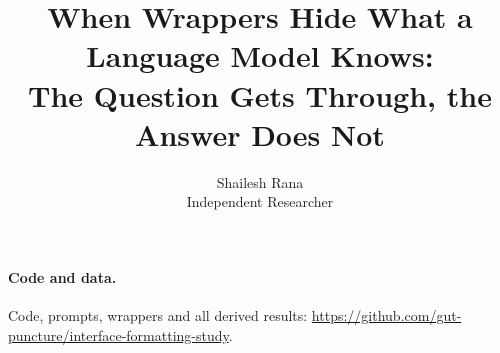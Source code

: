 \documentclass[10pt,twocolumn]{article}
\title{\vspace{-1.0em}\textbf{When Wrappers Hide What a Language Model Knows:\\The Question Gets Through, the Answer Does Not}}
\author{Shailesh Rana\\Independent Researcher}
\date{}
\begin{document}
\twocolumn[
\begin{@twocolumnfalse}
\maketitle
\vspace{-1.4em}
\begin{center}
\begin{minipage}{0.82\textwidth}
\begin{abstract}

\end{abstract}
\end{minipage}
\end{center}
\vspace{0.7em}
\end{@twocolumnfalse}
]








\paragraph{Code and data.} Code, prompts, wrappers and all derived results: \url{https://github.com/gut-puncture/interface-formatting-study}.

\small



\small
\appendix

\end{document}
